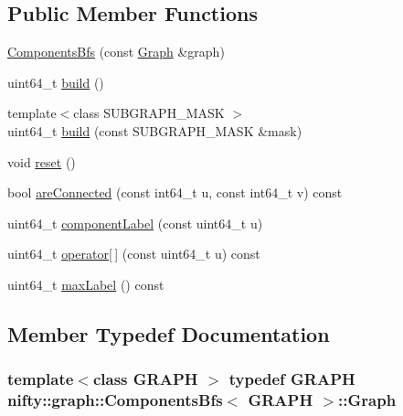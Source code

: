 \subsection*{Public Member Functions}
\begin{DoxyCompactItemize}
\item 
\hyperlink{classnifty_1_1graph_1_1ComponentsBfs_ad6eee39e29d7de39968ad1a9ce455a5c}{Components\+Bfs} (const \hyperlink{classnifty_1_1graph_1_1ComponentsBfs_a55dd18e0681b5eade08f755fe6e13625}{Graph} \&graph)
\item 
uint64\+\_\+t \hyperlink{classnifty_1_1graph_1_1ComponentsBfs_ac0190ac005f86f02b5e5a32abdfb97c5}{build} ()
\item 
{\footnotesize template$<$class S\+U\+B\+G\+R\+A\+P\+H\+\_\+\+M\+A\+S\+K $>$ }\\uint64\+\_\+t \hyperlink{classnifty_1_1graph_1_1ComponentsBfs_afb7115a59f27fb30906f91dc415e2c5b}{build} (const S\+U\+B\+G\+R\+A\+P\+H\+\_\+\+M\+A\+S\+K \&mask)
\item 
void \hyperlink{classnifty_1_1graph_1_1ComponentsBfs_a5f606101cb777ed110a4c1ea0ab25139}{reset} ()
\item 
bool \hyperlink{classnifty_1_1graph_1_1ComponentsBfs_a7eec0ff5c974fe4ce3164dfe92f69230}{are\+Connected} (const int64\+\_\+t u, const int64\+\_\+t v) const 
\item 
uint64\+\_\+t \hyperlink{classnifty_1_1graph_1_1ComponentsBfs_a00ef0fcd3715ca79a1f2720ff9998655}{component\+Label} (const uint64\+\_\+t u)
\item 
uint64\+\_\+t \hyperlink{classnifty_1_1graph_1_1ComponentsBfs_a81c88b95b4ea192602d3a06ab2eb860f}{operator\mbox{[}$\,$\mbox{]}} (const uint64\+\_\+t u) const 
\item 
uint64\+\_\+t \hyperlink{classnifty_1_1graph_1_1ComponentsBfs_ad82935ee9435b00614c191ede6415cf5}{max\+Label} () const 
\end{DoxyCompactItemize}


\subsection{Member Typedef Documentation}
\hypertarget{classnifty_1_1graph_1_1ComponentsBfs_a55dd18e0681b5eade08f755fe6e13625}{}
\subsubsection[{Graph}]{\setlength{\rightskip}{0pt plus 5cm}template$<$class G\+R\+A\+P\+H $>$ typedef G\+R\+A\+P\+H {\bf nifty\+::graph\+::\+Components\+Bfs}$<$ G\+R\+A\+P\+H $>$\+::{\bf Graph}}\label{classnifty_1_1graph_1_1ComponentsBfs_a55dd18e0681b5eade08f755fe6e13625}
\hypertarget{classnifty_1_1graph_1_1ComponentsBfs_a65c914297d3391021f4aab53c04e5711}{}

